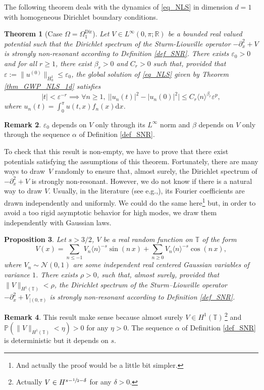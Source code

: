 \documentclass[11pt]{article}
\newcommand{\eg}{e.g.,\xspace}
\let\epsilon\varepsilon
\newtheorem{theorem}{Theorem}[section]
\newtheorem{proposition}[theorem]{Proposition}
\theoremstyle{definition}
\newtheorem{remark}[theorem]{Remark}
\begin{document}
The following theorem deals with the dynamics of \eqref{eq_NLS} in dimension $d=1$ with homogeneous Dirichlet boundary conditions.
\begin{theorem}[Case $\Omega = \Omega^{\mathrm{Dir}}_1$]
\label{thm_Dir_1d}
Let $V \in L^\infty(0,\pi; \mathbb{R})$ be a bounded real valued potential such that the Dirichlet spectrum of the Sturm-Liouville operator $-\partial_x^2 +V$ is strongly non-resonant according to Definition \ref{def_SNR}. There exists $\epsilon_0>0$ and for all $r\geq 1$, there exist $\beta_r>0$ and $C_r>0$ such that, provided that $\varepsilon:= \| u^{(0)} \|_{H^1_0} \leq \epsilon_{0}$,
the global solution of \eqref{eq_NLS} given by Theorem \ref{thm_GWP_NLS_1d} satisfies
\[
|t|< \varepsilon^{-r} \implies \forall n\geq 1, \ \big| |u_n(t)|^2 - |u_n(0)|^2 \big| \leq C_r \langle n \rangle^{\beta_r} \varepsilon^p,
\]
where $u_n(t) = \int_0^\pi u(t,x) f_n(x) \mathrm{d}x$.
\end{theorem}
\begin{remark}
\label{rem_dep}$\epsilon_0$ depends on $V$ only through its $L^\infty$ norm and $\beta$ depends on $V$ only through the sequence $\alpha$ of Definition \ref{def_SNR}.
\end{remark}

To check that this result is non-empty, we have to prove that there exist potentials satisfying the assumptions of this theorem. Fortunately, there are many ways to draw~$V$ randomly to ensure that, almost surely, the Dirichlet spectrum of $-\partial_x^2 +V$ is strongly non-resonant. However, we do not know if there is a natural way to draw $V$. Usually, in the literature (see \eg \cite{Bou00,BG06,YZ14,KillBill,KtA}), its Fourier coefficients are drawn independently and uniformly. We could do the same here\footnote{And actually the proof would be a little bit simpler.} but, in order to avoid a too rigid asymptotic behavior for high modes, we draw them independently with Gaussian laws.

\begin{proposition}
\label{prop_proba_dir_1d}
Let $s>3/2$, $V$ be a real random function on $\mathbb{T}$ of the form
\begin{equation}
\label{eq_V_dir}
V(x) = \sum_{n\leq -1} V_n \langle n \rangle^{-s} \sin(n \, x) + \sum_{n \geq 0 } V_n \langle n \rangle^{-s} \cos(n \, x),
\end{equation}
where $V_n \sim \mathcal{N}(0,1)$ are some independent real centered Gaussian variables of variance $1$. There exists $\rho>0$, such that, almost surely, provided that $\|V\|_{H^1(\mathbb{T})}< \rho$, the Dirichlet spectrum of the Sturm--Liouville operator $-\partial_x^2 +V_{| (0,\pi)}$ is strongly non-resonant according to Definition \ref{def_SNR}.
\end{proposition}
\begin{remark} This result make sense because almost surely $V\in H^1(\mathbb{T})\,$\footnote{Actually $V\in H^{s-\sfrac12-\delta}$ for any $\delta>0$.} and $\mathbb{P}(\|V\|_{H^1(\mathbb{T})} < \eta)>0$ for any $\eta>0$. The sequence $\alpha$ of Definition \ref{def_SNR} is deterministic but it depends on $s$.
\end{remark}
\end{document}
